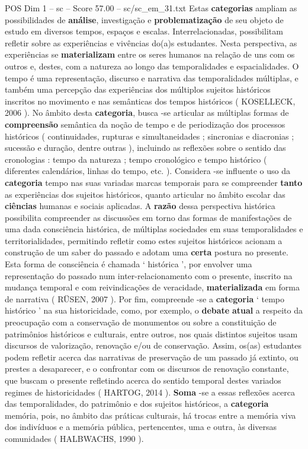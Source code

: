 \begin{textsample}{POS Dim 1 – sc – Score 57.00 – sc/sc\_em\_31.txt}
Estas \textbf{categorias} ampliam as possibilidades de \textbf{análise}, investigação e \textbf{problematização} de seu objeto de estudo em diversos tempos, espaços e escalas.
Interrelacionadas, possibilitam refletir sobre as experiências e vivências do(a)s estudantes.
Nesta perspectiva, as experiências se \textbf{materializam} entre os seres humanos na relação de uns com os outros e, destes, com a natureza ao longo das temporalidades e espacialidades.
O tempo é uma representação, discurso e narrativa das temporalidades múltiplas, e também uma percepção das experiências dos múltiplos sujeitos históricos inscritos no movimento e nas semânticas dos tempos históricos ( KOSELLECK, 2006 ).
No âmbito desta \textbf{categoria}, busca -se articular as múltiplas formas de \textbf{compreensão} semântica da noção de tempo e de periodização dos processos históricos ( continuidades, rupturas e simultaneidades ; sincronias e diacronias ; sucessão e duração, dentre outras ), incluindo as reflexões sobre o sentido das cronologias : tempo da natureza ; tempo cronológico e tempo histórico ( diferentes calendários, linhas do tempo, etc. ).
Considera -se influente o uso da \textbf{categoria} tempo nas suas variadas marcas temporais para se compreender \textbf{tanto} as experiências dos sujeitos históricos, quanto articular no âmbito escolar das \textbf{ciências} humanas e sociais aplicadas.
A \textbf{razão} dessa perspectiva histórica possibilita compreender as discussões em torno das formas de manifestações de uma dada consciência histórica, de múltiplas sociedades em suas temporalidades e territorialidades, permitindo refletir como estes sujeitos históricos acionam a construção de um saber do passado e adotam uma \textbf{certa} postura no presente.
Esta forma de consciência é chamada ‘ histórica ’, por envolver uma representação do passado num inter-relacionamento com o presente, inscrito na mudança temporal e com reivindicações de veracidade, \textbf{materializada} em forma de narrativa ( RÜSEN, 2007 ).
Por fim, compreende -se a \textbf{categoria} ‘ tempo histórico ’ na sua historicidade, como, por exemplo, o \textbf{debate} \textbf{atual} a respeito da preocupação com a conservação de monumentos ou sobre a constituição de patrimônios históricos e culturais, entre outros, nos quais distintos sujeitos usam discursos de valorização, renovação e/ou de conservação.
Assim, os(as) estudantes podem refletir acerca das narrativas de preservação de um passado já extinto, ou prestes a desaparecer, e o confrontar com os discursos de renovação constante, que buscam o presente refletindo acerca do sentido temporal destes variados regimes de historicidades ( HARTOG, 2014 ). \textbf{Soma} -se a essas reflexões acerca das temporalidades, do patrimônio e dos sujeitos históricos, a \textbf{categoria} memória, pois, no âmbito das práticas culturais, há trocas entre a memória viva dos indivíduos e a memória pública, pertencentes, uma e outra, às diversas comunidades ( HALBWACHS, 1990 ).

\end{textsample}
